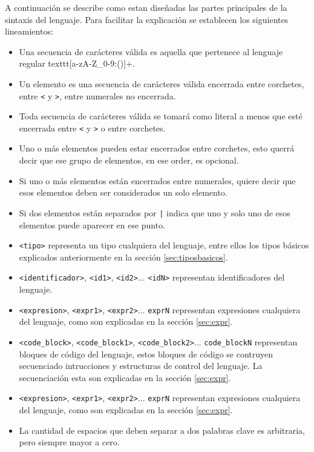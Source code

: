 \documentclass[12pt, spanish]{report}
\begin{document}
A continuación se describe como estan diseñadas las partes principales
de la sintaxis del lenguaje. Para facilitar la explicación se
establecen los siguientes lineamientos:

\begin{itemize}
\item Una secuencia de car\'acteres v\'alida es aquella que pertenece al
      lenguaje regular texttt{[a-zA-Z_0-9:()\n ]+}.

\item Un elemento es una secuencia de car\'acteres v\'alida encerrada
      entre corchetes, entre \texttt{<} y \texttt{>}, entre numerales no encerrada.

\item Toda secuencia de car\'acteres v\'alida se tomar\'a como literal a menos
      que est\'e encerrada entre \texttt{<} y \texttt{>} o entre corchetes.

\item Uno o m\'as elementos pueden estar encerrados entre corchetes,
      esto querr\'a decir que ese grupo de elementos, en ese order, es
      opcional.

\item Si uno o m\'as elementos est\'an encerrados entre numerales,
      quiere decir que esos elementos deben ser considerados un solo 
      elemento.

\item Si dos elementos est\'an separados por \texttt{|} indica que uno y
      solo uno de esos elementos puede aparecer en ese punto.

\item \texttt{<tipo>} representa un tipo cualquiera del lenguaje, entre ellos
  los tipos básicos explicados anteriormente en la sección
  \ref{sec:tiposbasicos}.

\item \texttt{<identificador>}, \texttt{<id1>}, \texttt{<id2>}...
  \texttt{<idN>} representan identificadores del lenguaje.

\item \texttt{<expresion>}, \texttt{<expr1>}, \texttt{<expr2>}...
  \texttt{exprN} representan expresiones cualquiera del lenguaje, como
  son explicadas en la sección \ref{sec:expr}.

\item \texttt{<code_block>}, \texttt{<code_block1>}, \texttt{<code_block2>}...
  \texttt{code_blockN} representan bloques de c\'odigo del lenguaje,
  estos bloques de c\'odigo se contruyen secuenciado intrucciones y
      estructuras de control del lenguaje. La secuenciaci\'on esta 
  son explicadas en la sección \ref{sec:expr}.

\item \texttt{<expresion>}, \texttt{<expr1>}, \texttt{<expr2>}...
  \texttt{exprN} representan expresiones cualquiera del lenguaje, como
  son explicadas en la sección \ref{sec:expr}.

\item La cantidad de espacios que deben separar a dos palabras clave es
      arbitraria, pero siempre mayor a cero.
\end{itemize}
\end{document}
